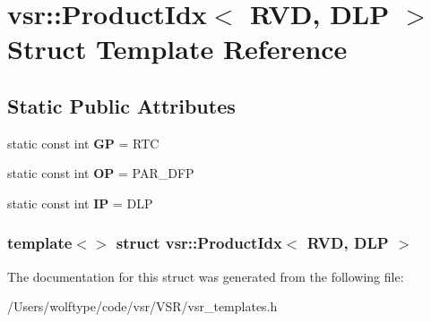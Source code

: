 \hypertarget{structvsr_1_1_product_idx_3_01_r_v_d_00_01_d_l_p_01_4}{\section{vsr\-:\-:Product\-Idx$<$ R\-V\-D, D\-L\-P $>$ Struct Template Reference}
\label{structvsr_1_1_product_idx_3_01_r_v_d_00_01_d_l_p_01_4}
}
\subsection*{Static Public Attributes}
\begin{DoxyCompactItemize}
\item 
\hypertarget{structvsr_1_1_product_idx_3_01_r_v_d_00_01_d_l_p_01_4_a81b4fa7a3143574410a3776c5b6a514f}{static const int {\bfseries G\-P} = R\-T\-C}\label{structvsr_1_1_product_idx_3_01_r_v_d_00_01_d_l_p_01_4_a81b4fa7a3143574410a3776c5b6a514f}

\item 
\hypertarget{structvsr_1_1_product_idx_3_01_r_v_d_00_01_d_l_p_01_4_ab506cbc43f6bf58441ca70b1421d942f}{static const int {\bfseries O\-P} = P\-A\-R\-\_\-\-D\-F\-P}\label{structvsr_1_1_product_idx_3_01_r_v_d_00_01_d_l_p_01_4_ab506cbc43f6bf58441ca70b1421d942f}

\item 
\hypertarget{structvsr_1_1_product_idx_3_01_r_v_d_00_01_d_l_p_01_4_aa772450af286be7efffa980a72f97a42}{static const int {\bfseries I\-P} = D\-L\-P}\label{structvsr_1_1_product_idx_3_01_r_v_d_00_01_d_l_p_01_4_aa772450af286be7efffa980a72f97a42}

\end{DoxyCompactItemize}
\subsubsection*{template$<$$>$ struct vsr\-::\-Product\-Idx$<$ R\-V\-D, D\-L\-P $>$}



The documentation for this struct was generated from the following file\-:\begin{DoxyCompactItemize}
\item 
/\-Users/wolftype/code/vsr/\-V\-S\-R/vsr\-\_\-templates.\-h\end{DoxyCompactItemize}
